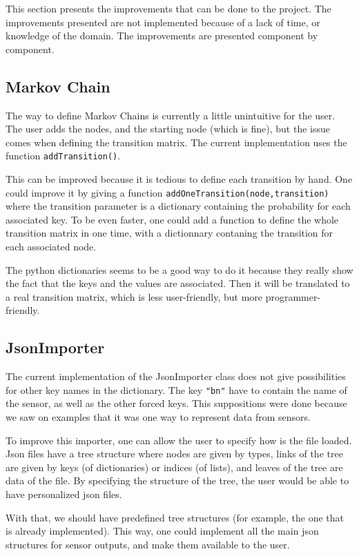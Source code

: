 This section presents the improvements that can be done to the project. The
improvements presented are not implemented because of a lack of time, or
knowledge of the domain. The improvements are presented component by component.

\subsection{Markov Chain}

\label{improvement_MC}

The way to define Markov Chains is currently a little unintuitive for the
user. The user adds the nodes, and the starting node (which is fine), but the
issue comes when defining the transition matrix. The current implementation
uses the function \verb!addTransition()!.

This can be improved because it is tedious to define each transition by
hand. One could improve it by giving a function \verb!addOneTransition(node,transition)! where the transition parameter is a dictionary containing
the probability for each associated key. To be even faster, one could add a
function to define the whole transition matrix in one time, with a dictionnary
contaning the transition for each associated node.

The python dictionaries seems to be a good way to do it because they really
show the fact that the keys and the values are associated. Then it will be
translated to a real transition matrix, which is less user-friendly, but more
programmer-friendly.


\subsection{JsonImporter}

\label{imprevoment_jsonimporter}

The current implementation of the JsonImporter class does not give
possibilities for other key names in the dictionary. The key \verb!"bn"! have
to contain the name of the sensor, as well as the other forced keys. This
suppositions were done because we saw on examples that it was one way to
represent data from sensors.

To improve this importer, one can allow the user to specify how is the file
loaded. Json files have a tree structure where nodes are given by types,
links of the tree are given by keys (of dictionaries) or indices (of lists),
and leaves of the tree are data of the file. By specifying the structure of the
tree, the user would be able to have personalized json files.

With that, we should have predefined tree structures (for example, the one
that is already implemented). This way, one could implement all the main json
structures for sensor outputs, and make them available to the user.
